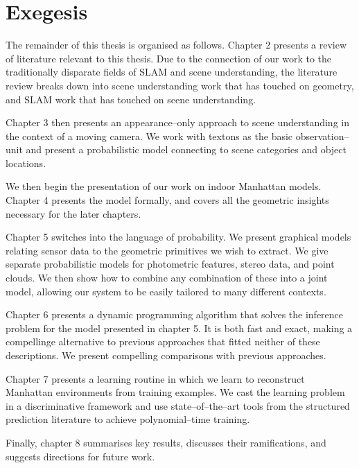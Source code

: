 \section{Exegesis}

The remainder of this thesis is organised as follows. Chapter 2
presents a review of literature relevant to this thesis. Due to the
connection of our work to the traditionally disparate fields of SLAM
and scene understanding, the literature review breaks down into scene
understanding work that has touched on geometry, and SLAM work that
has touched on scene understanding.

Chapter 3 then presents an appearance--only approach to scene
understanding in the context of a moving camera. We work with textons
as the basic observation--unit and present a probabilistic model
connecting to scene categories and object locations.

We then begin the presentation of our work on indoor Manhattan
models. Chapter 4 presents the model formally, and covers all the
geometric insights necessary for the later chapters.

Chapter 5 switches into the language of probability. We present
graphical models relating sensor data to the geometric primitives we
wish to extract. We give separate probabilistic models for photometric
features, stereo data, and point clouds. We then show how to combine
any combination of these into a joint model, allowing our system to be
easily tailored to many different contexts.

Chapter 6 presents a dynamic programming algorithm that solves the
inference problem for the model presented in chapter 5. It is both
fast and exact, making a compellinge alternative to previous
approaches that fitted neither of these descriptions. We present
compelling comparisons with previous approaches.

Chapter 7 presents a learning routine in which we learn to reconstruct
Manhattan environments from training examples. We cast the learning
problem in a discriminative framework and use state--of--the--art
tools from the structured prediction literature to achieve
polynomial--time training.

Finally, chapter 8 summarises key results, discusses their
ramifications, and suggests directions for future work.
